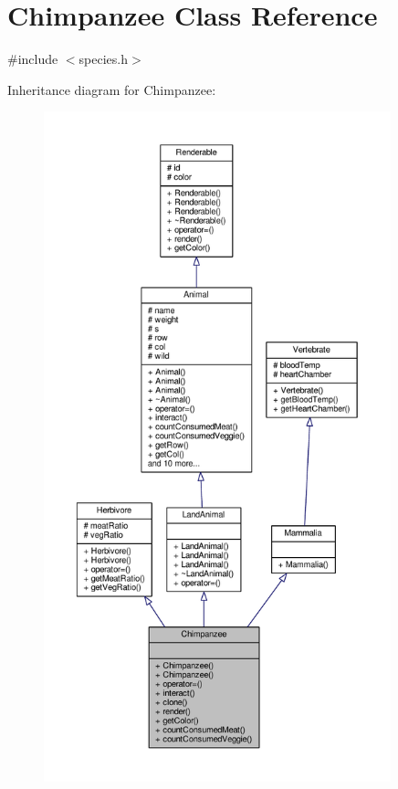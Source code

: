 \hypertarget{classChimpanzee}{}\section{Chimpanzee Class Reference}
\label{classChimpanzee}


{\ttfamily \#include $<$species.\+h$>$}



Inheritance diagram for Chimpanzee\+:
\nopagebreak
\begin{figure}[H]
\begin{center}
\leavevmode
\includegraphics[height=550pt]{classChimpanzee__inherit__graph}
\end{center}
\end{figure}


